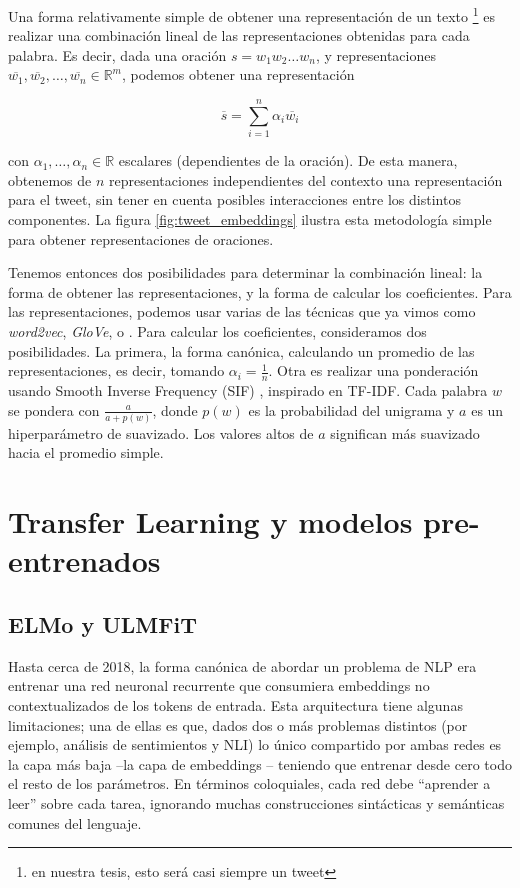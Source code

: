 Una forma relativamente simple de obtener una representación de un texto \footnote{en nuestra tesis, esto será casi siempre un tweet} es realizar una combinación lineal de las representaciones obtenidas para cada palabra. Es decir, dada una oración $s = w_1 w_2 \ldots w_n$, y representaciones $\overline{w_1}, \overline{w_2}, \ldots, \overline{w_n} \in \mathbb{R}^m$, podemos obtener una representación

\begin{equation}
    \overline{s} = \sum\limits_{i=1}^{n} \alpha_i \overline{w_i}
\end{equation}

\noindent con $\alpha_1, \ldots, \alpha_n \in \mathbb{R}$ escalares (dependientes de la oración). De esta manera, obtenemos de $n$ representaciones independientes del contexto una representación para el tweet, sin tener en cuenta posibles interacciones entre los distintos componentes. La figura \ref{fig:tweet_embeddings} ilustra esta metodología simple para obtener representaciones de oraciones.

Tenemos entonces dos posibilidades para determinar la combinación lineal: la forma de obtener las representaciones, y la forma de calcular los coeficientes. Para las representaciones, podemos usar varias de las técnicas que ya vimos como \emph{word2vec}, \emph{GloVe}, o \fasttext{}. Para calcular los coeficientes, consideramos dos posibilidades. La primera, la forma canónica, calculando un promedio de las representaciones, es decir, tomando $\alpha_i = \frac{1}{n}$. Otra es realizar una ponderación usando Smooth Inverse Frequency (SIF) \cite{arora17}, inspirado en TF-IDF. Cada palabra $ w $ se pondera con $ \frac {a} {a + p (w)} $, donde $ p (w) $ es la probabilidad del unigrama  y $a$ es un hiperparámetro de suavizado. Los valores altos de $ a $ significan más suavizado hacia el promedio simple.



\section{Transfer Learning y modelos pre-entrenados}

\subsection{ELMo y ULMFiT}
\label{subsec:elmo}

Hasta cerca de 2018, la forma canónica de abordar un problema de NLP era entrenar una red neuronal recurrente que consumiera embeddings no contextualizados de los tokens de entrada. Esta arquitectura tiene algunas limitaciones; una de ellas es que, dados dos o más problemas distintos (por ejemplo, análisis de sentimientos y NLI) lo único compartido por ambas redes es la capa más baja --la capa de embeddings -- teniendo que entrenar desde cero todo el resto de los parámetros. En términos coloquiales, cada red debe ``aprender a leer'' sobre cada tarea, ignorando muchas construcciones sintácticas y semánticas comunes del lenguaje.

